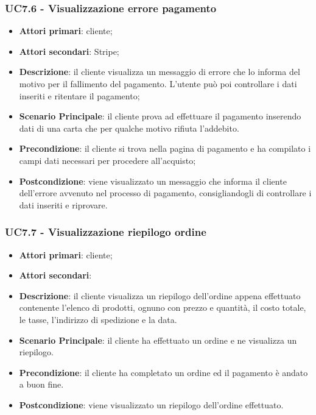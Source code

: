 \subsubsection{UC7.6 - Visualizzazione errore pagamento}
\begin{itemize}
\item \textbf{Attori primari}: cliente;
\item \textbf{Attori secondari}: Stripe;
\item \textbf{Descrizione}: il cliente visualizza un messaggio di errore che lo informa del motivo per il fallimento del pagamento. L'utente può poi controllare i dati inseriti e ritentare il pagamento;
\item \textbf{Scenario Principale}: il cliente prova ad effettuare il pagamento inserendo dati di una carta che per qualche motivo rifiuta l'addebito.
\item \textbf{Precondizione}: il cliente si trova nella pagina di pagamento e ha compilato i campi dati necessari per procedere all'acquisto;
\item \textbf{Postcondizione}: viene visualizzato un messaggio che informa il cliente dell'errore avvenuto nel processo di pagamento, consigliandogli di controllare i dati inseriti e riprovare.
\end{itemize}


\subsubsection{UC7.7 - Visualizzazione riepilogo ordine}
\begin{itemize}
\item \textbf{Attori primari}: cliente;
\item \textbf{Attori secondari}:
\item \textbf{Descrizione}: il cliente visualizza un riepilogo dell'ordine appena effettuato contenente l'elenco di prodotti, ognuno con prezzo e quantità, il costo totale, le tasse, l'indirizzo di spedizione e la data.
\item \textbf{Scenario Principale}: il cliente ha effettuato un ordine e ne visualizza un riepilogo.
\item \textbf{Precondizione}: il cliente ha completato un ordine ed il pagamento è andato a buon fine.
\item \textbf{Postcondizione}: viene visualizzato un riepilogo dell'ordine effettuato.
\end{itemize}
